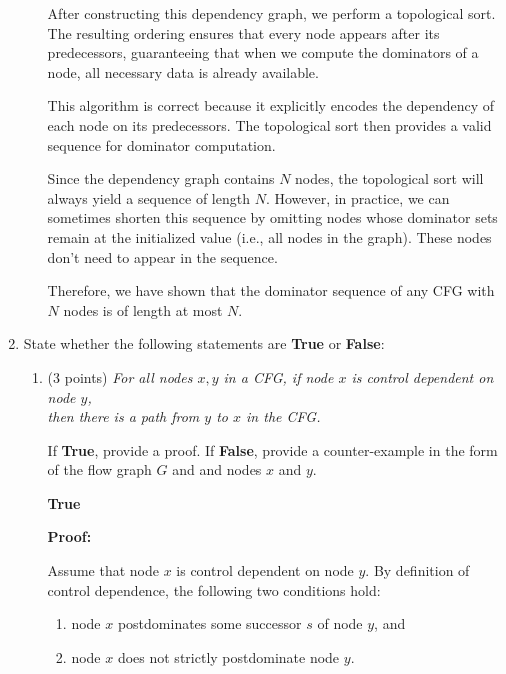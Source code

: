 \documentclass[12pt]{article}
\begin{document}
\begin{enumerate}
\begin{enumerate}
\begin{mdframed}
    After constructing this dependency graph, we perform a topological sort. The resulting ordering ensures that every node appears after its predecessors, guaranteeing that when we compute the dominators of a node, all necessary data is already available.

    This algorithm is correct because it explicitly encodes the dependency of each node on its predecessors. The topological sort then provides a valid sequence for dominator computation.

    Since the dependency graph contains \( N \) nodes, the topological sort will always yield a sequence of length \( N \). However, in practice, we can sometimes shorten this sequence by omitting nodes whose dominator sets remain at the initialized value (i.e., all nodes in the graph). These nodes don't need to appear in the sequence.

    Therefore, we have shown that the dominator sequence of any CFG with \( N \) nodes is of length at most \( N \).

      
    \end{mdframed}
      \end{enumerate}

      \item State whether the following statements are \textbf{True} or
      \textbf{False}:
      \begin{enumerate}
        \item (3 points) \emph{For all nodes $x, y$ in a CFG, if node $x$ is
        control dependent on node $y$, \\
        then there is a path from $y$ to $x$ in the CFG.}

        If \textbf{True}, provide a proof.
        If \textbf{False}, provide a counter-example in the form of the flow
        graph $G$ and and nodes $x$ and $y$.
        \begin{mdframed}
          \textbf{True}

          \textbf{Proof:}

          Assume that node $x$ is control dependent on node $y$. By definition of control dependence, the following two conditions hold:

          \begin{enumerate}
            \item node $x$ postdominates some successor $s$ of node $y$, and
            \item node $x$ does not strictly postdominate node $y$.
          \end{enumerate}


\end{mdframed}
\end{enumerate}
\end{enumerate}
\end{document}
